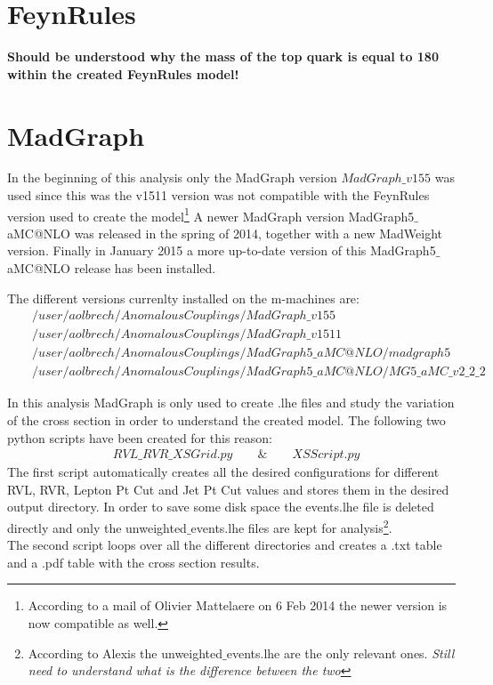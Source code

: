 \section{FeynRules}
\textbf{Should be understood why the mass of the top quark is equal to 180 within the created FeynRules model!}

\section{MadGraph}

In the beginning of this analysis only the MadGraph version $MadGraph\_v155$ was used since this was the v1511 version was not compatible with the FeynRules version used to create the model\footnote{According to a mail of Olivier Mattelaere on 6 Feb 2014 the newer version is now compatible as well.}
A newer MadGraph version MadGraph5$\_$aMC@NLO was released in the spring of 2014, together with a new MadWeight version. Finally in January 2015 a more up-to-date version of this MadGraph5$\_$aMC@NLO release has been installed. %

The different versions currenlty installed on the m-machines are:
\begin{eqnarray}
 & & /user/aolbrech/AnomalousCouplings/MadGraph\_v155 \nonumber \\
 & & /user/aolbrech/AnomalousCouplings/MadGraph\_v1511 \nonumber \\
 & & /user/aolbrech/AnomalousCouplings/MadGraph5\_aMC@NLO/madgraph5 \nonumber \\
 & & /user/aolbrech/AnomalousCouplings/MadGraph5\_aMC@NLO/MG5\_aMC\_v2\_2\_2 \nonumber
\end{eqnarray}


In this analysis MadGraph is only used to create .lhe files and study the variation of the cross section in order to understand the created model. The following two python scripts have been created for this reason:
\begin{eqnarray*}
  & RVL\_RVR\_XSGrid.py \qquad \& \qquad XSScript.py \nonumber
\end{eqnarray*}
The first script automatically creates all the desired configurations for different RVL, RVR, Lepton Pt Cut and Jet Pt Cut values and stores them in the desired output directory.
In order to save some disk space the events.lhe file is deleted directly and only the unweighted$\_$events.lhe files are kept for analysis\footnote{According to Alexis the unweighted$\_$events.lhe are the only relevant ones. \textit{Still need to understand what is the difference between the two}}.\\
The second script loops over all the different directories and creates a .txt table and a .pdf table with the cross section results.\\

